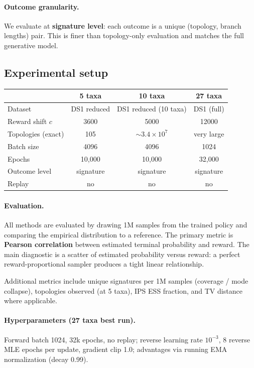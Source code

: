 \documentclass[11pt]{article}
\begin{document}
\paragraph{Outcome granularity.}
We evaluate at \textbf{signature level}: each outcome is a unique (topology, branch lengths) pair. This is finer than topology-only evaluation and matches the full generative model.

\subsection{Experimental setup}

\begin{center}
\begin{tabular}{@{}lccc@{}}
\toprule
 & 5 taxa & 10 taxa & 27 taxa \\
\midrule
Dataset & DS1 reduced & DS1 reduced (10 taxa) & DS1 (full) \\
Reward shift \(c\) & 3600 & 5000 & 12000 \\
Topologies (exact) & 105 & \(\sim 3.4\times 10^7\) & very large \\
Batch size & 4096 & 4096 & 1024 \\
Epochs & 10{,}000 & 10{,}000 & 32{,}000 \\
Outcome level & signature & signature & signature \\
Replay & no & no & no \\
\bottomrule
\end{tabular}
\end{center}

\paragraph{Evaluation.}
All methods are evaluated by drawing 1M samples from the trained policy and comparing the empirical distribution to a reference. The primary metric is \textbf{Pearson correlation} between estimated terminal probability and reward. The main diagnostic is a scatter of estimated probability versus reward: a perfect reward-proportional sampler produces a tight linear relationship.

Additional metrics include unique signatures per 1M samples (coverage / mode collapse), topologies observed (at 5 taxa), IPS ESS fraction, and TV distance where applicable.

\paragraph{Hyperparameters (27 taxa best run).}
Forward batch 1024, 32k epochs, no replay; reverse learning rate \(10^{-3}\), 8 reverse MLE epochs per update, gradient clip 1.0; advantages via running EMA normalization (decay 0.99).
\end{document}
